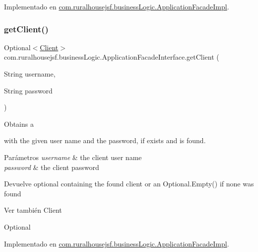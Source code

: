 Implementado en \mbox{\hyperlink{classcom_1_1ruralhousejsf_1_1business_logic_1_1_application_facade_impl_a22bb7d4b98f51470315a81cd0d6f2290}{com.\+ruralhousejsf.\+business\+Logic.\+Application\+Facade\+Impl}}.

\mbox{\label{interfacecom_1_1ruralhousejsf_1_1business_logic_1_1_application_facade_interface_af9901ddc9cbe77aaa08085c3c19167c6}} 
\subsubsection{\texorpdfstring{getClient()}{getClient()}}
{\footnotesize\ttfamily Optional$<$\mbox{\hyperlink{classcom_1_1ruralhousejsf_1_1domain_1_1_client}{Client}}$>$ com.\+ruralhousejsf.\+business\+Logic.\+Application\+Facade\+Interface.\+get\+Client (\begin{DoxyParamCaption}\item[{String}]{username,  }\item[{String}]{password }\end{DoxyParamCaption})}

Obtains a
\begin{DoxyCode}{0}
\end{DoxyCode}
 with the given user name and the password, if exists and is found.


\begin{DoxyParams}{Parámetros}
{\em username} & the client user name \\
\hline
{\em password} & the client password\\
\hline
\end{DoxyParams}
\begin{DoxyReturn}{Devuelve}
optional containing the found client or an {\ttfamily Optional.\+Empty()} if none was found
\end{DoxyReturn}
\begin{DoxySeeAlso}{Ver también}
Client 

Optional 
\end{DoxySeeAlso}


Implementado en \mbox{\hyperlink{classcom_1_1ruralhousejsf_1_1business_logic_1_1_application_facade_impl_a249a902aa3507a04fb15ab5fcf1f082c}{com.\+ruralhousejsf.\+business\+Logic.\+Application\+Facade\+Impl}}.

